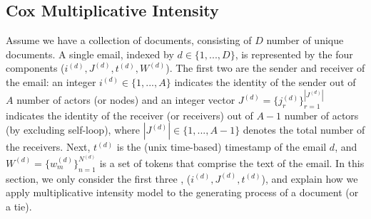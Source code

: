 \documentclass[a4paper]{article}
\begin{document}
\subsection{Cox Multiplicative Intensity}
Assume we have a collection of documents, consisting of $D$ number of unique documents. A single email, indexed by $d \in \{1,...,D\}$, is represented by the four components ($i^{(d)}, J^{(d)}, t^{(d)},  W^{(d)}$). The first two are the sender and receiver of the email: an integer $i^{(d)} \in \{1,...,A\}$ indicates the identity of the sender out of $A$ number of actors (or nodes) and an integer vector $J^{(d)} = \{j_r^{(d)}\}_{r=1}^{|J^{(d)}|} $ indicates the identity of the receiver (or receivers) out of $A-1$ number of actors (by excluding self-loop), where $|J^{(d)}|\in \{1,...,A-1\}$ denotes the total number of the receivers. Next, $t^{(d)}$ is the (unix time-based) timestamp of the email $d$, and $W^{(d)} = \{w^{(d)}_m \}_{n=1}^{N^{(d)}}$ is a set of tokens that comprise the text of the email. In this section, we only consider the first three , ($i^{(d)}, J^{(d)}, t^{(d)}$), and explain how we apply multiplicative intensity model to the generating process of a document (or a tie). \\ \newline 
\end{document}
